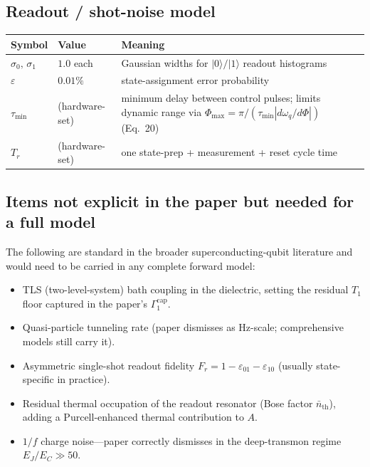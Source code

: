 \documentclass[11pt,a4paper]{article}
\begin{document}
\subsection{Readout / shot-noise model}

\begin{center}
\begin{tabular}{@{}lll@{}}
\toprule
Symbol & Value & Meaning \\
\midrule
$\sigma_0,\,\sigma_1$ & $1.0$ each & Gaussian widths for $|0\rangle/|1\rangle$ readout histograms \\
$\varepsilon$ & $0.01\%$ & state-assignment error probability \\
$\tau_{\min}$ & (hardware-set) & minimum delay between control pulses; limits dynamic range via $\Phi_{\max} = \pi/(\tau_{\min}|d\omega_q/d\Phi|)$ (Eq.~20) \\
$T_r$ & (hardware-set) & one state-prep + measurement + reset cycle time \\
\bottomrule
\end{tabular}
\end{center}

\subsection{Items not explicit in the paper but needed for a full model}

The following are standard in the broader superconducting-qubit literature and would need to be carried in any complete forward model:
\begin{itemize}[nosep,leftmargin=2em]
  \item TLS (two-level-system) bath coupling in the dielectric, setting the residual $T_1$ floor captured in the paper's $\Gamma_1^{\mathrm{cap}}$.
  \item Quasi-particle tunneling rate (paper dismisses as Hz-scale; comprehensive models still carry it).
  \item Asymmetric single-shot readout fidelity $F_r = 1 - \varepsilon_{01} - \varepsilon_{10}$ (usually state-specific in practice).
  \item Residual thermal occupation of the readout resonator (Bose factor $\bar n_{\mathrm{th}}$), adding a Purcell-enhanced thermal contribution to $A$.
  \item $1/f$ charge noise---paper correctly dismisses in the deep-transmon regime $E_J/E_C \gg 50$.
\end{itemize}

\end{document}
